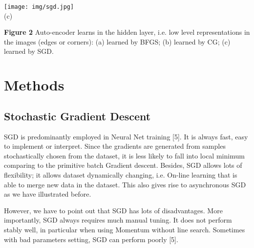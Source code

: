 \documentclass{article} %
\begin{document}
\begin{center}
\texttt{[image: img/sgd.jpg]} \\
(c)
\end{center}
{\bf Figure 2} Auto-encoder learns in the hidden layer, i.e. low level representations in the images (edges or corners): (a) learned by BFGS; (b) learned by CG; (c) learned by SGD.

\section{Methods}
\subsection{Stochastic Gradient Descent}
SGD is predominantly employed in Neural Net training [5]. It is always fast, easy to implement or interpret. Since the gradients are generated from samples stochastically chosen from the dataset, it is less likely to fall into local minimum comparing to the primitive batch Gradient descent. Besides, SGD allows lots of flexibility; it allows dataset dynamically changing, i.e. On-line learning that is able to merge new data in the dataset. This also gives rise to asynchronous SGD as we have illustrated before.

However, we have to point out that SGD has lots of disadvantages. More importantly, SGD always requires much manual tuning. It does not perform stably well, in particular when using Momentum without line search. Sometimes with bad parameters setting, SGD can perform poorly [5].
\end{document}
